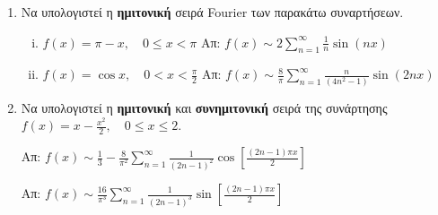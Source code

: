 \begin{enumerate}
  \item Να υπολογιστεί η \textbf{ημιτονική} σειρά Fourier των παρακάτω συναρτήσεων.
    \begin{enumerate}[i)]
      \item $ f(x) = \pi - x, \quad 0 \leq x < \pi $
        \hfill Απ: $ f(x) \sim 2\sum_{n=1}^{\infty} \frac{1}{n} \sin{(nx)}$ 

      \item $ f(x) = \cos{x} , \quad 0 < x < \frac{\pi}{2} $
        \hfill Απ: $ f(x) \sim \frac{8}{\pi} \sum_{n=1}^{\infty} \frac{n}{(4n^{2}-1)} 
        \sin{(2nx)} $ 
    \end{enumerate}

  \item Να υπολογιστεί η \textbf{ημιτονική} και \textbf{συνημιτονική} σειρά της 
    συνάρτησης $ f(x) = x - \frac{x^{2}}{2}, \quad 0 \leq x \leq 2 $.

    \hfill Απ: $ f(x) \sim \frac{1}{ 3} - \frac{8}{\pi ^{2}} \sum_{n=1}^{\infty}
    \frac{1}{(2n-1)^{2}} \cos{\left[\frac{(2n-1) \pi x}{2}\right]} $  

    \hfill Απ: $ f(x) \sim \frac{16}{\pi ^{3}} \sum_{n=1}^{\infty} \frac{1}{(2n-1)^{3}}
    \sin{\left[\frac{(2n-1) \pi x}{2}\right]} $  
\end{enumerate}

